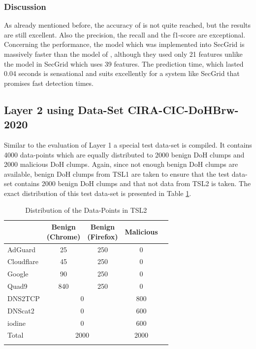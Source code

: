 \subsubsection{Discussion}
As already mentioned before, the accuracy of \cite{BehnkeEtAl_FeatureEngineeringMLModelMaliciusDoHTraffic} is not quite reached, but the results are still excellent. Also the precision, the recall and the f1-score are exceptional. Concerning the performance, the model which was implemented into SecGrid is massively faster than the model of \cite{BehnkeEtAl_FeatureEngineeringMLModelMaliciusDoHTraffic}, although they used only 21 features unlike the model in SecGrid which uses 39 features. The prediction time, which lasted 0.04 seconds is sensational and suits excellently for a system like SecGrid that promises fast detection times.

\subsection{Layer 2 using Data-Set CIRA-CIC-DoHBrw-2020} \label{eval_l2}
Similar to the evaluation of Layer 1 a special test data-set is compiled. It contains 4000 data-points which are equally distributed to 2000 benign DoH clumps and 2000 malicious DoH clumps. Again, since not enough benign DoH clumps are available, benign DoH clumps from TSL1 are taken to ensure that the test data-set contains 2000 benign DoH clumps and that not data from TSL2 is taken. The exact distribution of this test data-set is presented in Table \ref{tab:tds_l2}.

\begin{center}
\begin{longtable}{ |l|c|c|c|c| }
\hline
 & \makecell{Benign\\(Chrome)} & \makecell{Benign\\(Firefox)} & Malicious \\
\hline
AdGuard & 25 & 250 & 0 \\
Cloudflare & 45 & 250 & 0 \\
Google & 90 & 250 & 0 \\
Quad9 & 840 & 250 & 0 \\
\hline
DNS2TCP & \multicolumn{2}{|c|}{0} & 800 \\
DNScat2 & \multicolumn{2}{|c|}{0} & 600 \\
iodine & \multicolumn{2}{|c|}{0} & 600 \\
\hline
Total & \multicolumn{2}{|c|}{2000} & 2000 \\
\hline
\caption{Distribution of the Data-Points in TSL2}
\label{tab:tds_l2}
\end{longtable}
\end{center}


